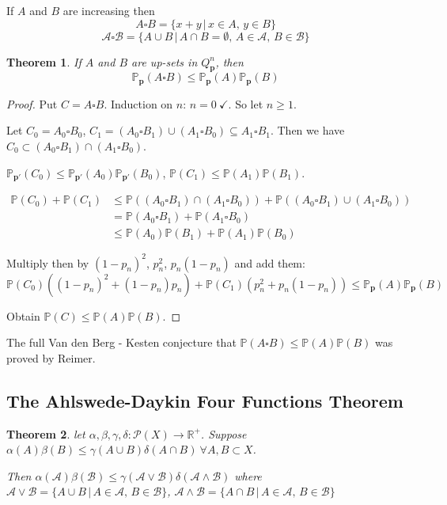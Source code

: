 \documentclass[a4paper]{article}
\newtheorem{theorem}{Theorem}
\begin{document}
If $A$ and $B$ are increasing then
$$A \square B = \{ x+y \,|\, x \in A,\, y \in B\}$$
$$\mathcal{A} \square \mathcal{B} = \{A \cup B \,|\, A\cap B = \emptyset,\, A \in \mathcal{A},\, B \in \mathcal{B}\}$$

\begin{theorem}
	If $A$ and $B$ are up-sets in $Q^n_\mathbf{p}$, then
	$$\mathbb{P}_\mathbf{p}(A \square B) \leq \mathbb{P}_\mathbf{p}(A)\mathbb{P}_\mathbf{p}(B)$$
\end{theorem}
\begin{proof}
	Put $C = A \square B$. Induction on $n$: $n=0\ \checkmark$. So let $n \geq 1$.
	
	Let $C_0 = A_0 \square B_0$, $C_1 = (A_0 \square B_1) \cup (A_1 \square B_0) \subseteq A_1 \square B_1$.
	Then we have $C_0 \subset (A_0 \square B_1) \cap (A_1 \square B_0)$.
	
	$\mathbb{P}_\mathbf{p'}(C_0) \leq \mathbb{P}_\mathbf{p'}(A_0)\mathbb{P}_\mathbf{p'}(B_0)$,
	$\mathbb{P}(C_1) \leq \mathbb{P}(A_1)\mathbb{P}(B_1)$.
	
	\begin{align*}
		\mathbb{P}(C_0) + \mathbb{P}(C_1) & \leq \mathbb{P}((A_0 \square B_1) \cap (A_1 \square B_0)) + \mathbb{P}((A_0 \square B_1) \cup (A_1 \square B_0)) \\
		&= \mathbb{P}(A_0\square B_1) + \mathbb{P}(A_1 \square B_0) \\
		&\leq \mathbb{P}(A_0)\mathbb{P}(B_1) + \mathbb{P}(A_1)\mathbb{P}(B_0)
	\end{align*}
	
	Multiply then by $(1-p_n)^2$, $p_n^2$, $p_n(1-p_n)$ and add them:
	$$\mathbb{P}(C_0)((1-p_n)^2+(1-p_n)p_n) + \mathbb{P}(C_1)(p_n^2 + p_n(1-p_n)) \leq \mathbb{P}_\mathbf{p}(A)\mathbb{P}_\mathbf{p}(B)$$
	
	Obtain $\mathbb{P}(C) \leq \mathbb{P}(A) \mathbb{P}(B)$.
\end{proof}

The full Van den Berg - Kesten conjecture that $\mathbb{P}(A \square B) \leq \mathbb{P}(A)\mathbb{P}(B)$ was proved by Reimer.

\subsection{The Ahlswede-Daykin Four Functions Theorem}
\begin{theorem}
	let $\alpha, \beta, \gamma, \delta: \mathcal{P}(X) \to \mathbb{R}^+$.
	Suppose $\alpha(A)\beta(B) \leq \gamma(A \cup B)\delta(A \cap B)\ \forall A, B \subset X$.
	
	Then $\alpha(\mathcal{A})\beta(\mathcal{B}) \leq \gamma(\mathcal{A} \vee \mathcal{B})\delta(\mathcal{A} \wedge \mathcal{B})$
	where $\mathcal{A} \vee \mathcal{B} = \{A \cup B \,|\, A \in \mathcal{A},\, B \in \mathcal{B} \}$,
	$\mathcal{A} \wedge \mathcal{B} = \{A \cap B \,|\, A \in \mathcal{A},\, B \in \mathcal{B} \}$
\end{theorem}
\end{document}
